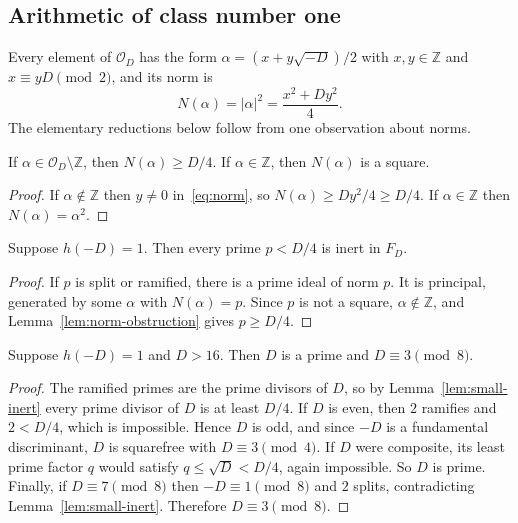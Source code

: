 \subsection{Arithmetic of class number one}\label{subsec:arith}

Every element of $\mathcal{O}_D$ has the form $\alpha=(x+y\sqrt{-D})/2$ with
$x,y\in\mathbb{Z}$ and $x\equiv yD\pmod 2$, and its norm is
\begin{equation}\label{eq:norm}
  N(\alpha)=|\alpha|^2=\frac{x^2+Dy^2}{4}.
\end{equation}
The elementary reductions below follow from one observation about norms.

\begin{lemma}\label{lem:norm-obstruction}
If $\alpha\in\mathcal{O}_D\setminus\mathbb{Z}$, then $N(\alpha)\ge D/4$. If
$\alpha\in\mathbb{Z}$, then $N(\alpha)$ is a square.
\end{lemma}

\begin{proof}
If $\alpha\notin\mathbb{Z}$ then $y\ne0$ in~\eqref{eq:norm}, so $N(\alpha)\ge
Dy^2/4\ge D/4$. If $\alpha\in\mathbb{Z}$ then $N(\alpha)=\alpha^2$.
\end{proof}

\begin{lemma}\label{lem:small-inert}
Suppose $h(-D)=1$. Then every prime $p<D/4$ is inert in $F_D$.
\end{lemma}

\begin{proof}
If $p$ is split or ramified, there is a prime ideal of norm $p$. It is
principal, generated by some $\alpha$ with $N(\alpha)=p$. Since $p$ is not a
square, $\alpha\notin\mathbb{Z}$, and Lemma~\ref{lem:norm-obstruction} gives
$p\ge D/4$.
\end{proof}

\begin{lemma}[Reduction]\label{lem:reduction}
Suppose $h(-D)=1$ and $D>16$. Then $D$ is a prime and $D\equiv3\pmod 8$.
\end{lemma}

\begin{proof}
The ramified primes are the prime divisors of $D$, so by
Lemma~\ref{lem:small-inert} every prime divisor of $D$ is at least $D/4$. If
$D$ is even, then $2$ ramifies and $2<D/4$, which is impossible. Hence $D$ is
odd, and since $-D$ is a fundamental discriminant, $D$ is squarefree with
$D\equiv3\pmod4$. If $D$ were composite, its least prime factor $q$ would
satisfy $q\le\sqrt D<D/4$, again impossible. So $D$ is prime. Finally, if
$D\equiv7\pmod8$ then $-D\equiv1\pmod 8$ and $2$ splits, contradicting
Lemma~\ref{lem:small-inert}. Therefore $D\equiv3\pmod8$.
\end{proof}

